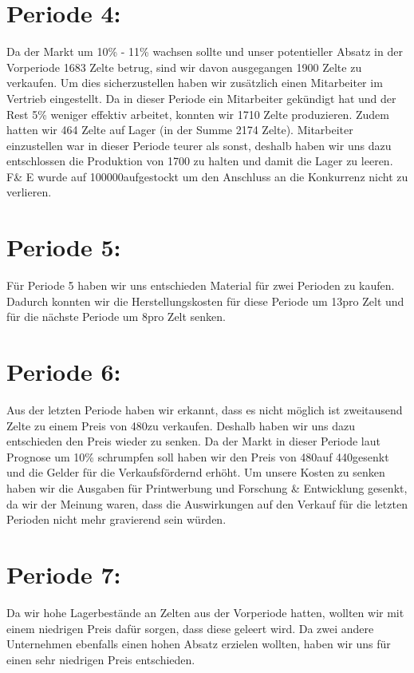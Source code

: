 \documentclass[a4paper, 12pt]{report}
\begin{document}
\begin{flushleft}
\section{Periode 4:}
Da der Markt um 10\% - 11\% wachsen sollte und unser potentieller Absatz in der Vorperiode 1683 Zelte betrug, sind wir davon ausgegangen 1900 Zelte zu verkaufen.
Um dies sicherzustellen haben wir zusätzlich einen Mitarbeiter im Vertrieb eingestellt.
Da in dieser Periode ein Mitarbeiter gekündigt hat und der Rest 5\% weniger effektiv arbeitet, konnten wir  1710 Zelte produzieren.
Zudem hatten wir 464 Zelte auf Lager (in der Summe 2174 Zelte).
Mitarbeiter einzustellen war in dieser Periode teurer als sonst,
deshalb haben wir uns dazu entschlossen die Produktion von 1700 zu halten und damit die Lager zu leeren.
F\& E wurde auf 100000\texteuro aufgestockt um den Anschluss an die Konkurrenz nicht zu verlieren.  

\section{Periode 5:}
Für Periode 5 haben wir uns entschieden Material für zwei Perioden zu kaufen.
Dadurch konnten wir die Herstellungskosten für diese Periode um 13\texteuro pro Zelt und für die nächste Periode um 8\texteuro pro Zelt senken.

\newpage
\section{Periode 6:}
Aus der letzten Periode haben wir erkannt, dass es nicht möglich ist zweitausend Zelte zu einem Preis von 480\texteuro zu verkaufen.
Deshalb haben wir uns dazu entschieden den Preis wieder zu senken.
Da der Markt in dieser Periode laut Prognose um 10\% schrumpfen soll haben wir den Preis von 480\texteuro auf 440\texteuro gesenkt und die Gelder für die Verkaufsfördernd erhöht.
Um unsere Kosten zu senken haben wir die Ausgaben für Printwerbung und Forschung \& Entwicklung gesenkt, da wir der Meinung waren, dass die Auswirkungen auf den Verkauf für die letzten Perioden nicht mehr gravierend sein würden.


\section{Periode 7:}
Da wir hohe Lagerbestände an Zelten aus der Vorperiode hatten, wollten wir mit einem niedrigen Preis dafür sorgen,
dass diese geleert wird.
Da zwei andere Unternehmen ebenfalls einen hohen Absatz erzielen wollten, haben wir uns für einen sehr niedrigen Preis entschieden.



\end{flushleft}
\end{document}
